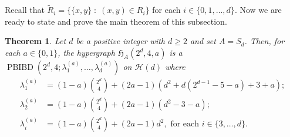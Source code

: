 \documentclass[11pt]{article}
\newtheorem{theorem}{Theorem}[section]
\begin{document}
Recall that $\tilde{R}_i=\{\{x,y\}  \; : \;  (x,y)\in R_i\}$ for each $i\in\{0,1,\dots,d\}$. 
Now we are ready to state and prove the main theorem of this subsection.

\begin{theorem}\label{thm:signedcube}
Let $d$ be a positive integer with $d\geqslant 2$ and set $A = S_d$. 
Then, for each $a \in \{0,1\}$, the hypergraph $\mathfrak H_{A}(2^d,4,a)$
is a $\operatorname{PBIBD}(2^d,4;\lambda_1^{(a)},\ldots,\lambda_d^{(a)})$ on $\mathcal H(d)$ where 
\begin{align*}
    \lambda_1^{(a)} &= (1-a)\binom{2^d}{4}+(2a-1)(d^2+d(2^{d-1}-5-a)+3+a); \\
    \lambda_2^{(a)} &= (1-a)\binom{2^d}{4}+(2a-1)(d^2-3-a); \\
    \lambda_i^{(a)} &=(1-a)\binom{2^d}{4} + (2a-1)d^2, \text{ for each }i \in \{3,\dots,d\}.
\end{align*}
\end{theorem}
\end{document}

